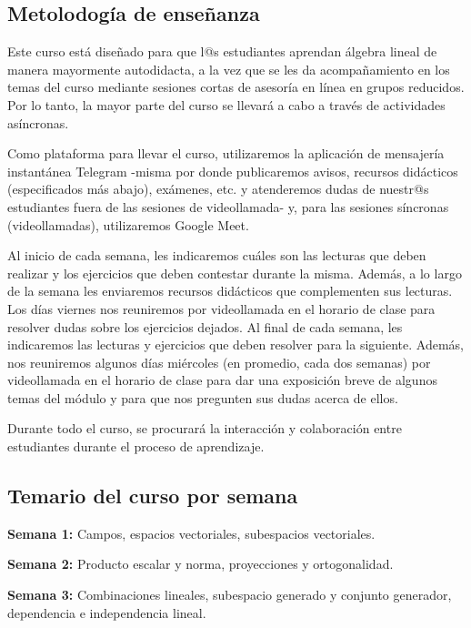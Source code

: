 \documentclass[12pt,dvipsnames]{article}
\begin{document}
\subsection{Metolodogía de enseñanza}

 Este curso está diseñado para que l@s estudiantes aprendan álgebra lineal de manera mayormente autodidacta, a la vez que se les da acompañamiento en los temas del curso mediante sesiones cortas de asesoría en línea en grupos reducidos. Por lo tanto, la mayor parte del curso se llevará a cabo a través de actividades asíncronas.

 \vspace{3mm}
  Como plataforma para llevar el curso, utilizaremos la aplicación de mensajería instantánea Telegram -misma por donde publicaremos avisos, recursos didácticos (especificados más abajo), exámenes, etc. y atenderemos dudas de nuestr@s estudiantes fuera de las sesiones de videollamada- y, para las sesiones síncronas (videollamadas), utilizaremos Google Meet.

  \vspace{3mm}
Al inicio de cada semana, les indicaremos cuáles son las lecturas que deben realizar y los ejercicios que deben contestar durante la misma. Además, a lo largo de la semana les enviaremos recursos didácticos que complementen sus lecturas. Los días viernes nos reuniremos por videollamada en el horario de clase para resolver dudas sobre los ejercicios dejados. Al final de cada semana, les indicaremos las lecturas y ejercicios que deben resolver para la siguiente. Además, nos reuniremos algunos días miércoles (en promedio, cada dos semanas) por videollamada en el horario de clase para dar una exposición breve de algunos temas del módulo y para que nos pregunten sus dudas acerca de ellos.

\vspace{3mm}
Durante todo el curso, se procurará la interacción y colaboración entre estudiantes durante el proceso de aprendizaje.

\subsection{Temario del curso por semana}

\textbf{Semana 1:}  Campos, espacios vectoriales, subespacios vectoriales.

\vspace{3mm}
\textbf{Semana 2:}  Producto escalar y norma, proyecciones y ortogonalidad.

\vspace{3mm}
\textbf{Semana 3:}  Combinaciones lineales, subespacio generado y conjunto generador, dependencia e independencia lineal.
\end{document}
